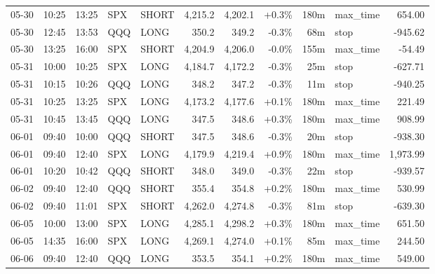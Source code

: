 \documentclass[11pt,a4paper,twoside]{article}
\begin{document}
\begin{center}
\begin{longtable}{>{\color{txtmain}}l l l l l r r r r >{\color{txtmain}}l r}
05-30 & 10:25 & 13:25 & SPX & SHORT & 4,215.2 & 4,202.1 & \textcolor{wingreen}{+0.3\%} & 180m & max\_time & \textcolor{wingreen}{654.00} \\
05-30 & 12:45 & 13:53 & QQQ & LONG & 350.2 & 349.2 & \textcolor{lossred}{-0.3\%} & 68m & stop & \textcolor{lossred}{-945.62} \\
05-30 & 13:25 & 16:00 & SPX & SHORT & 4,204.9 & 4,206.0 & \textcolor{lossred}{-0.0\%} & 155m & max\_time & \textcolor{lossred}{-54.49} \\
05-31 & 10:00 & 10:25 & SPX & LONG & 4,184.7 & 4,172.2 & \textcolor{lossred}{-0.3\%} & 25m & stop & \textcolor{lossred}{-627.71} \\
05-31 & 10:15 & 10:26 & QQQ & LONG & 348.2 & 347.2 & \textcolor{lossred}{-0.3\%} & 11m & stop & \textcolor{lossred}{-940.25} \\
05-31 & 10:25 & 13:25 & SPX & LONG & 4,173.2 & 4,177.6 & \textcolor{wingreen}{+0.1\%} & 180m & max\_time & \textcolor{wingreen}{221.49} \\
05-31 & 10:45 & 13:45 & QQQ & LONG & 347.5 & 348.6 & \textcolor{wingreen}{+0.3\%} & 180m & max\_time & \textcolor{wingreen}{908.99} \\
06-01 & 09:40 & 10:00 & QQQ & SHORT & 347.5 & 348.6 & \textcolor{lossred}{-0.3\%} & 20m & stop & \textcolor{lossred}{-938.30} \\
06-01 & 09:40 & 12:40 & SPX & LONG & 4,179.9 & 4,219.4 & \textcolor{wingreen}{+0.9\%} & 180m & max\_time & \textcolor{wingreen}{1,973.99} \\
06-01 & 10:20 & 10:42 & QQQ & SHORT & 348.0 & 349.0 & \textcolor{lossred}{-0.3\%} & 22m & stop & \textcolor{lossred}{-939.57} \\
06-02 & 09:40 & 12:40 & QQQ & SHORT & 355.4 & 354.8 & \textcolor{wingreen}{+0.2\%} & 180m & max\_time & \textcolor{wingreen}{530.99} \\
06-02 & 09:40 & 11:01 & SPX & SHORT & 4,262.0 & 4,274.8 & \textcolor{lossred}{-0.3\%} & 81m & stop & \textcolor{lossred}{-639.30} \\
06-05 & 10:00 & 13:00 & SPX & LONG & 4,285.1 & 4,298.2 & \textcolor{wingreen}{+0.3\%} & 180m & max\_time & \textcolor{wingreen}{651.50} \\
06-05 & 14:35 & 16:00 & SPX & LONG & 4,269.1 & 4,274.0 & \textcolor{wingreen}{+0.1\%} & 85m & max\_time & \textcolor{wingreen}{244.50} \\
06-06 & 09:40 & 12:40 & QQQ & LONG & 353.5 & 354.1 & \textcolor{wingreen}{+0.2\%} & 180m & max\_time & \textcolor{wingreen}{549.00} \\

\end{longtable}
\end{center}
\end{document}
